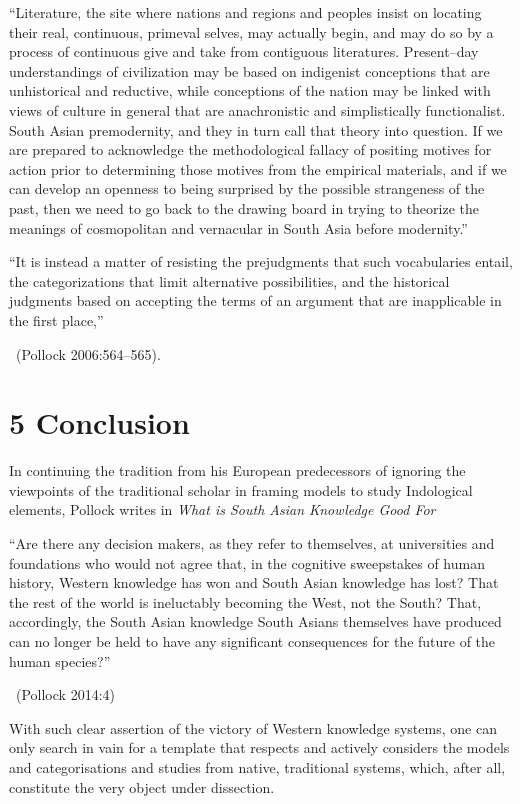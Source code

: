 “Literature, the site where nations and regions and peoples insist on locating their real, continuous, primeval selves, may actually begin, and may do so by a process of continuous give and take from contiguous literatures. Present–day understandings of civilization may be based on indigenist conceptions that are unhistorical and reductive, while conceptions of the nation may be linked with views of culture in general that are anachronistic and simplistically functionalist. South Asian premodernity, and they in turn call that theory into question. If we are prepared to acknowledge the methodological fallacy of positing motives for action prior to determining those motives from the empirical materials, and if we can develop an openness to being surprised by the possible strangeness of the past, then we need to go back to the drawing board in trying to theorize the meanings of cosmopolitan and vernacular in South Asia before modernity.”

“It is instead a matter of resisting the prejudgments that such vocabularies entail, the categorizations that limit alternative possibilities, and the historical judgments based on accepting the terms of an argument that are inapplicable in the first place,” 

~\hfill (Pollock 2006:564–565).


\section*{5 Conclusion}

In continuing the tradition from his European predecessors of ignoring the viewpoints of the traditional scholar in framing models to study Indological elements, Pollock writes in \textit{What is South Asian Knowledge Good For}

\begin{myquote}
“Are there any decision makers, as they refer to themselves, at universities and foundations who would not agree that, in the cognitive sweepstakes of human history, Western knowledge has won and South Asian knowledge has lost? That the rest of the world is ineluctably becoming the West, not the South? That, accordingly, the South Asian knowledge South Asians themselves have produced can no longer be held to have any significant consequences for the future of the human species?” 

~\hfill (Pollock 2014:4)
\end{myquote}

With such clear assertion of the victory of Western knowledge systems, one can only search in vain for a template that respects and actively considers the models and categorisations and studies from native, traditional systems, which, after all, constitute the very object under dissection.

